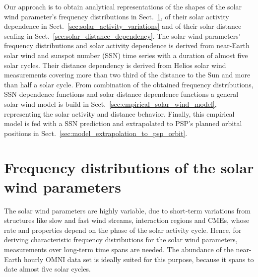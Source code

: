 Our approach is to obtain analytical representations of the shapes of the solar wind parameter’s frequency distributions in Sect.~\ref{sec:frequency_distribution}, of their solar activity dependence in Sect.~\ref{sec:solar_activity_variations} and of their solar distance scaling in Sect.~\ref{sec:solar_distance_dependency}. The solar wind parameters’ frequency distributions and solar activity dependence is derived from near-Earth solar wind and sunspot number (SSN) time series with a duration of almost five solar cycles. Their distance dependency is derived from Helios solar wind measurements covering more than two third of the distance to the Sun and more than half a solar cycle. From combination of the obtained frequency distributions, SSN dependence functions and solar distance dependence functions a general solar wind model is build in Sect.~\ref{sec:empirical_solar_wind_model}, representing the solar activity and distance behavior. Finally, this empirical model is fed with a SSN prediction and extrapolated to PSP's planned orbital positions in Sect.~\ref{sec:model_extrapolation_to_psp_orbit}.


\section{Frequency distributions of the solar wind parameters}
\label{sec:frequency_distribution}
The solar wind parameters are highly variable, due to short-term variations from structures like slow and fast wind streams, interaction regions and CMEs, whose rate and properties depend on the phase of the solar activity cycle. Hence, for deriving characteristic frequency distributions for the solar wind parameters, measurements over long-term time spans are needed. The abundance of the near-Earth hourly OMNI data set is ideally suited for this purpose, because it spans to date almost five solar cycles.

